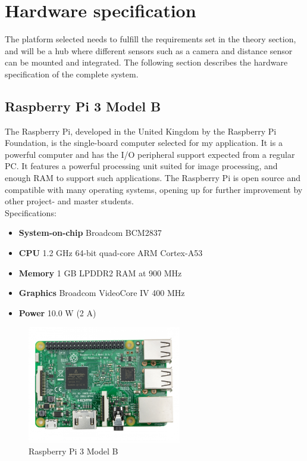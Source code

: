 \section{Hardware specification}
The platform selected needs to fulfill the requirements set in the theory section, and will be a hub where different sensors such as a camera and distance sensor can be mounted and integrated. The following section describes the hardware specification of the complete system.
\subsection{Raspberry Pi 3 Model B}
The Raspberry Pi, developed in the United Kingdom by the Raspberry Pi Foundation, is the single-board computer selected for my application. It is a powerful computer and has the I/O peripheral support expected from a regular PC. It features a powerful processing unit suited for image processing, and enough RAM to support such applications. The Raspberry Pi is open source and compatible with many operating systems, opening up for further improvement by other project- and master students.\\

Specifications\cite{rpi}:
\begin{itemize}
\itemsep0em 
\item \textbf{System-on-chip} Broadcom BCM2837
\item \textbf{CPU} 1.2 GHz 64-bit quad-core ARM Cortex-A53
\item \textbf{Memory} 1 GB LPDDR2 RAM at 900 MHz
\item \textbf{Graphics}	Broadcom VideoCore IV 400 MHz
\item \textbf{Power} 10.0 W (2 A)
\end{itemize}
\begin{figure}[H]
  \centering
  \includegraphics[width=0.6\textwidth]{fig/rpi}
  \caption{Raspberry Pi 3 Model B}
  \label{fig:gsd}
\end{figure}


